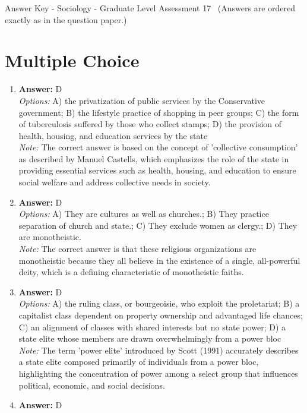 \documentclass[12pt]{article}
\begin{document}
\begin{center}
Answer Key - Sociology - Graduate Level Assessment 17 \
\small (Answers are ordered exactly as in the question paper.)
\end{center}

\section*{Multiple Choice}
\begin{enumerate}[label=\arabic*.]
\item \textbf{Answer:} D
\\ \textit{Options:} A) the privatization of public services by the Conservative government; B) the lifestyle practice of shopping in peer groups; C) the form of tuberculosis suffered by those who collect stamps; D) the provision of health, housing, and education services by the state
\\ \textit{Note:} The correct answer is based on the concept of 'collective consumption' as described by Manuel Castells, which emphasizes the role of the state in providing essential services such as health, housing, and education to ensure social welfare and address collective needs in society.
\item \textbf{Answer:} D
\\ \textit{Options:} A) They are cultures as well as churches.; B) They practice separation of church and state.; C) They exclude women as clergy.; D) They are monotheistic.
\\ \textit{Note:} The correct answer is that these religious organizations are monotheistic because they all believe in the existence of a single, all-powerful deity, which is a defining characteristic of monotheistic faiths.
\item \textbf{Answer:} D
\\ \textit{Options:} A) the ruling class, or bourgeoisie, who exploit the proletariat; B) a capitalist class dependent on property ownership and advantaged life chances; C) an alignment of classes with shared interests but no state power; D) a state elite whose members are drawn overwhelmingly from a power bloc
\\ \textit{Note:} The term 'power elite' introduced by Scott (1991) accurately describes a state elite composed primarily of individuals from a power bloc, highlighting the concentration of power among a select group that influences political, economic, and social decisions.
\item \textbf{Answer:} D

\end{enumerate}
\end{document}
